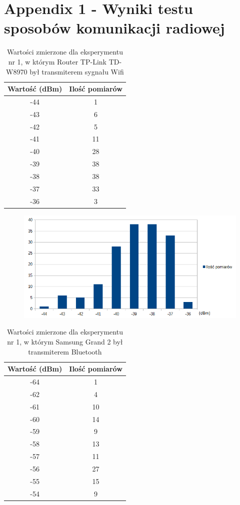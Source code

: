 \chapter{Appendix 1 - Wyniki testu sposobów komunikacji radiowej}

\begin{table}[H]
	\caption {Wartości zmierzone dla eksperymentu nr 1, w którym Router TP-Link TD-W8970 był transmiterem sygnału Wifi}
\begin{center}
		\begin{tabular}{|c|c|}
			\hline
			Wartość (dBm) & Ilość pomiarów \\ 
			\hline
			-44 & 1\\
			\hline
			-43 & 6\\
			\hline
			-42 & 5\\
			\hline
			-41 & 11\\
			\hline
			-40 & 28\\
			\hline
			-39 & 38\\
			\hline
			-38 & 38\\
			\hline
			-37 & 33\\
			\hline
			-36 & 3\\
			\hline
		\end{tabular}
\end{center}
\end{table}
\begin{figure}[H]			
	\centering
	\includegraphics[width=1.0\textwidth]{wykres_wifi_1}
\end{figure}
\begin{table}[H]
	\caption{Wartości zmierzone dla eksperymentu nr 1, w którym Samsung Grand 2 był  transmiterem Bluetooth}
\begin{center}
		\begin{tabular}{|c|c|}
			\hline
			Wartość (dBm) & Ilość pomiarów \\ 
			\hline
			-64 & 1\\
			\hline
			-62 & 4\\
			\hline
			-61 & 10\\
			\hline
			-60 & 14\\
			\hline
			-59 & 9\\
			\hline
			-58 & 13\\
			\hline
			-57 & 11\\
			\hline
			-56 & 27\\
			\hline
			-55 & 15\\
			\hline
			-54 & 9\\
			\hline
		\end{tabular}
\end{center}
\end{table}
